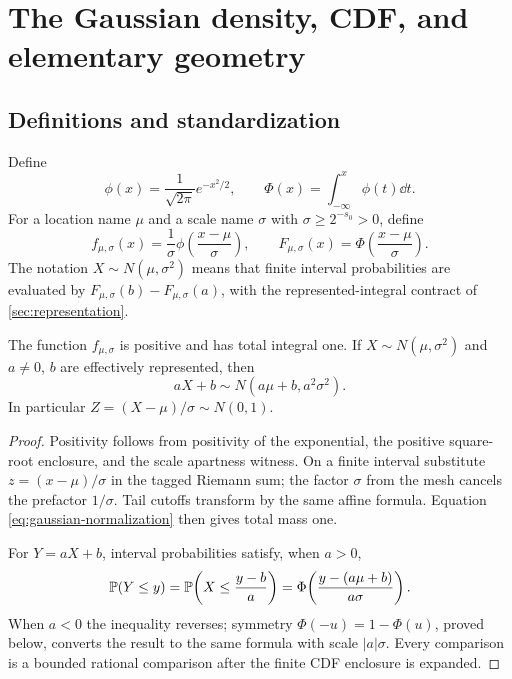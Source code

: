 \section{The Gaussian density, CDF, and elementary geometry}\label{sec:gaussian-core}

\subsection{Definitions and standardization}

Define
\begin{equation}\label{eq:phi-def}
 \phi(x)=\frac{1}{\sqrt{2\pi}}e^{-x^2/2},
 \qquad
 \Phi(x)=\int_{-\infty}^{x}\phi(t)\dd t.
\end{equation}
For a location name $\mu$ and a scale name $\sigma$ with $\sigma\ge2^{-s_0}>0$, define
\begin{equation}\label{eq:normal-density}
 f_{\mu,\sigma}(x)=\frac1\sigma\phi\!\left(\frac{x-\mu}{\sigma}\right),
 \qquad
 F_{\mu,\sigma}(x)=\Phi\!\left(\frac{x-\mu}{\sigma}\right).
\end{equation}
The notation $X\sim N(\mu,\sigma^2)$ means that finite interval probabilities are evaluated by $F_{\mu,\sigma}(b)-F_{\mu,\sigma}(a)$, with the represented-integral contract of \cref{sec:representation}.

\begin{theorem}\label{thm:normalization-standardization}
The function $f_{\mu,\sigma}$ is positive and has total integral one.  If $X\sim N(\mu,\sigma^2)$ and $a\ne0$, $b$ are effectively represented, then
\[
 aX+b\sim N(a\mu+b,a^2\sigma^2).
\]
In particular $Z=(X-\mu)/\sigma\sim N(0,1)$.
\end{theorem}

\begin{proof}
Positivity follows from positivity of the exponential, the positive square-root enclosure, and the scale apartness witness.  On a finite interval substitute $z=(x-\mu)/\sigma$ in the tagged Riemann sum; the factor $\sigma$ from the mesh cancels the prefactor $1/\sigma$.  Tail cutoffs transform by the same affine formula.  Equation \eqref{eq:gaussian-normalization} then gives total mass one.

For $Y=aX+b$, interval probabilities satisfy, when $a>0$,
\[
 \mathbb P(Y\le y)=\mathbb P\!\left(X\le\frac{y-b}{a}\right)
 =\Phi\!\left(\frac{y-(a\mu+b)}{a\sigma}\right).
\]
When $a<0$ the inequality reverses; symmetry $\Phi(-u)=1-\Phi(u)$, proved below, converts the result to the same formula with scale $|a|\sigma$.  Every comparison is a bounded rational comparison after the finite CDF enclosure is expanded.
\end{proof}

